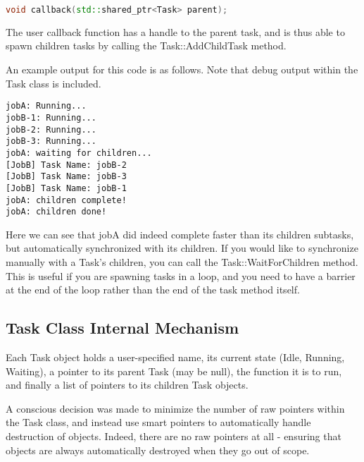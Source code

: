 \documentclass[11pt]{article}
\begin{document}
            \begin{lstlisting}[language=C++]
void callback(std::shared_ptr<Task> parent);
            \end{lstlisting}
                
                                
            The user callback function has a handle to the parent task, and is thus able to spawn
            children tasks by calling the Task::AddChildTask method.
            
            An example output for this code is as follows. Note that debug output within the Task class is
            included.
                
            \pagebreak
                
            \begin{verbatim}
jobA: Running...
jobB-1: Running...
jobB-2: Running...
jobB-3: Running...
jobA: waiting for children...
[JobB] Task Name: jobB-2
[JobB] Task Name: jobB-3
[JobB] Task Name: jobB-1
jobA: children complete!
jobA: children done!
            \end{verbatim}
                
            Here we can see that jobA did indeed complete faster than its children subtasks, but automatically
            synchronized with its children. If you would like to synchronize manually with a Task's children,
            you can call the Task::WaitForChildren method. This is useful if you are spawning tasks in a loop,
            and you need to have a barrier at the end of the loop rather than the end of the task method itself.
                
        \subsection{Task Class Internal Mechanism}
                Each Task object holds a user-specified name, its current state (Idle, Running, Waiting), 
                a pointer to its parent Task (may be null), the function it is to run, and finally a list of pointers
                to its children Task objects. 
                
                A conscious decision was made to minimize the number of raw pointers within the Task class, and instead
                use smart pointers to automatically handle destruction of objects. Indeed, there are no raw pointers
                at all - ensuring that objects are always automatically destroyed when they go out of scope. 
                
\end{document}
